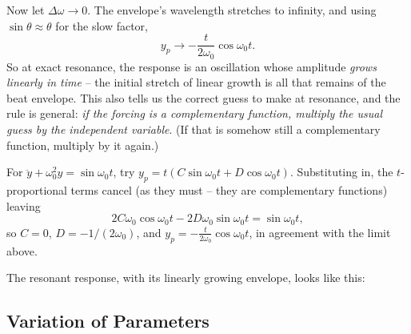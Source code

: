 \begin{center}
\end{center}

Now let $\Delta \omega \to 0$. The envelope's wavelength stretches to infinity, and using $\sin \theta \approx \theta$ for the slow factor,
$$
y_p \to -\frac{t}{2\omega_0} \cos \omega_0 t.
$$
So at exact resonance, the response is an oscillation whose amplitude \emph{grows linearly in time} -- the initial stretch of linear growth is all that remains of the beat envelope. This also tells us the correct guess to make at resonance, and the rule is general: \emph{if the forcing is a complementary function, multiply the usual guess by the independent variable}. (If that is somehow still a complementary function, multiply by it again.)

\begin{example}
	For $\ddot y + \omega_0^2 y = \sin \omega_0 t$, try $y_p = t(C \sin \omega_0 t + D \cos \omega_0 t)$. Substituting in, the $t$-proportional terms cancel (as they must -- they are complementary functions) leaving
	$$
	2 C \omega_0 \cos \omega_0 t - 2D\omega_0 \sin \omega_0 t = \sin \omega_0 t,
	$$
	so $C = 0$, $D = -1/(2\omega_0)$, and $y_p = -\frac{t}{2\omega_0}\cos \omega_0 t$, in agreement with the limit above.
\end{example}

The resonant response, with its linearly growing envelope, looks like this:

\begin{center}
\end{center}

\subsection{Variation of Parameters}

